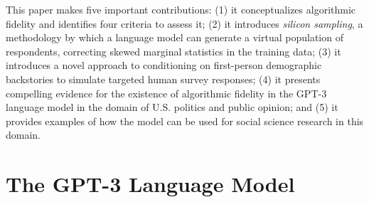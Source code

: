 \documentclass[11pt]{article}
\begin{document}

This paper makes five important contributions: (1) it conceptualizes algorithmic fidelity and identifies four criteria to assess it; (2) it introduces \emph{silicon sampling}, a methodology by which a language model can generate a virtual population of respondents, correcting skewed marginal statistics in the training data; (3) it introduces a novel approach to conditioning on first-person demographic backstories to simulate targeted human survey responses; (4) it presents compelling evidence for the existence of algorithmic fidelity in the GPT-3 language model in the domain of U.S. politics and public opinion; and (5) it provides examples of how the model can be used for social science research in this domain. %




\section{The GPT-3 Language Model}

\end{document}
